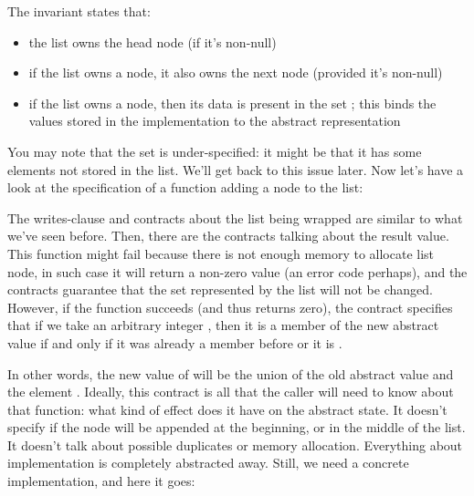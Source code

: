 
\noindent
The invariant states that:
\begin{itemize}
\item the list owns the head node (if it's non-null)
\item if the list owns a node, it also owns the next node (provided it's non-null)
\item if the list owns a node, then its data is present in the set ;
      this binds the values stored in the implementation to the abstract representation
\end{itemize}
You may note that the set  is under-specified: 
it might be that it has some elements not stored in the list.
We'll get back to this issue later.
Now let's have a look at the specification of a function adding a
node to the list:


\noindent
The writes-clause and contracts about the list being wrapped are similar to what
we've seen before.
Then, there are the contracts talking about the result value.
This function might fail because there is not enough memory to allocate list node,
in such case it will return a non-zero value (an error code perhaps),
and the contracts guarantee that the set represented by the list will not be changed.
However, if the function succeeds (and thus returns zero), the contract specifies
that if we take an arbitrary integer , then it is a member of the new abstract
value if and only if it was already a member before or it is .

In other words, the new value of  will be the union of the old
abstract value and the element .
Ideally, this contract is all that the caller will need to know about that function:
what kind of effect does it have on the abstract state. 
It doesn't specify if the node will be appended at the beginning, or in the middle
of the list.
It doesn't talk about possible duplicates or memory allocation.
Everything about implementation is completely abstracted away.
Still, we need a concrete implementation, and here it goes:


